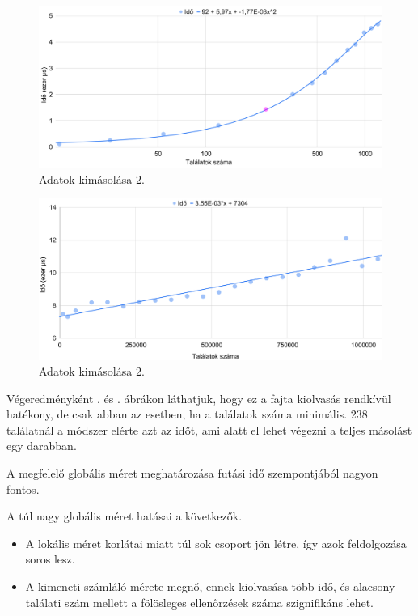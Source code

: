 \begin{figure}[h!]
\centering
\includegraphics[width=14.8cm]{images/graph/outpuffer2_1.png}
\caption{Adatok kimásolása 2.}
\label{fig:outpuffer2_1}
\end{figure}

\begin{figure}[h!]
\centering
\includegraphics[width=14.8cm]{images/graph/outpuffer2_2.png}
\caption{Adatok kimásolása 2.}
\label{fig:outpuffer2_2}
\end{figure}

Végeredményként . és . ábrákon láthatjuk, hogy ez a fajta kiolvasás rendkívül hatékony, de csak abban az esetben, ha a találatok száma minimális.
238 találatnál a módszer elérte azt az időt, ami alatt el lehet végezni a teljes másolást egy darabban.


A megfelelő globális méret meghatározása futási idő szempontjából nagyon fontos.

A túl nagy globális méret hatásai a következők.
\begin{itemize}
\item A lokális méret korlátai miatt túl sok csoport jön létre, így azok feldolgozása soros lesz.
\item A kimeneti számláló mérete megnő, ennek kiolvasása több idő, és alacsony találati szám mellett a fölösleges ellenőrzések száma szignifikáns lehet.
\end{itemize}

